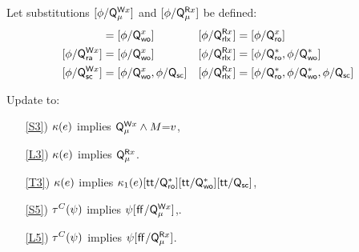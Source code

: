 \begin{definition}
  Let substitutions $[\phi/\mathsf{Q}_{\mu}^{\mathsf{W}x}]$ and  $[\phi/\mathsf{Q}_{\mu}^{\mathsf{R}x}]$ be defined:
  \begin{align*}
    [\aForm/\QS{\aLoc}{\mRLX}] &= [\aForm/\Qw{\aLoc}]
    &{} [\aForm/\QL{\aLoc}{\mRLX}] &= [\aForm/\Qr{\aLoc}]
    \\
    [\aForm/\QS{\aLoc}{\mRA}] &= [\aForm/\Qw{\aLoc}]
    &{} [\aForm/\QL{\aLoc}{\mRLX}] &= [\aForm/\Qr{*},\aForm/\Qw{*}]
    \\
    [\aForm/\QS{\aLoc}{\mSC}] &= [\aForm/\Qw{\aLoc},\aForm/\Qsc]
    &{} [\aForm/\QL{\aLoc}{\mRLX}] &= [\aForm/\Qr{*},\aForm/\Qw{*},\aForm/\Qsc]
  \end{align*}
\end{definition}

\begin{definition}[$\xCO$/$\xRASC$]
  \label{def:QS}
  \label{def:pomsets-ra}
  Update  to:
  \begin{enumerate}
  \item[\ref{S3})]
    $\kappa(e)$ implies $\mathsf{Q}_{\mu}^{\mathsf{W}x}\land M{=}v$,
  \item[\ref{L3})]
    $\kappa(e)$ implies $\mathsf{Q}_{\mu}^{\mathsf{R}x}$.
  \item[\ref{T3})]
    $\kappa(e)$ implies $\kappa_1(e)[\mathsf{tt}/\mathsf{Q}_{\mathsf{ro}}^{*}][\mathsf{tt}/\mathsf{Q}_{\mathsf{wo}}^{*}][\mathsf{tt}/\mathsf{Q}_{\mathsf{sc}}]$,
  \end{enumerate}
  \begin{enumerate}
  \item[\ref{S5})]
    $\aTr{\cEvs}{\bForm}$ implies $\psi[\mkern.6mu\mathsf{ff}\mkern.6mu/\mathsf{Q}_{\mu}^{\mathsf{W}x}]$,.
  \item[\ref{L5})]
    $\aTr{\cEvs}{\bForm}$ implies $\psi[\mkern.6mu\mathsf{ff}\mkern.6mu/\mathsf{Q}_{\mu}^{\mathsf{R}x}]$.
  \end{enumerate}
\end{definition}







